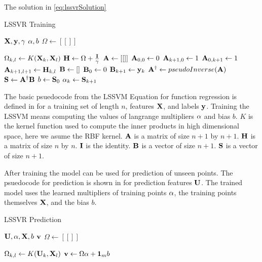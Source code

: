 The solution in \cref{eq:lssvrSolution}

\begin{algorithm}[H]
  \caption{LSSVR Training}\label{alg1:cap}
  \begin{algorithmic}[1]
    \Require $\vb{X}, \vb{y}, \gamma$
    \Ensure $\vb{\alpha}, b$
    \State $\Omega \gets [[]]$ 

    \State$\Omega_{k,l}\gets K(\vb{X}_k,\vb{X}_l)$
    \EndFor
    \EndFor
    \State $\vb{H} \gets \Omega + \frac{\vb{I}}{\gamma}$
    \State $\vb{A} \gets [[]]$ 
    \State $\vb{A}_{0,0} \gets 0$
    \State $\vb{A}_{k+1,0} \gets 1$
    \State $\vb{A}_{0,k+1} \gets 1$
    \EndFor
    \State $\vb{A}_{k+1,l+1} \gets \vb{H}_{k,l}$
    \EndFor
    \EndFor
    \State $\vb{B}\gets []$ 
    \State $\vb{B}_0 \gets 0$
    \State $\vb{B}_{k+1} \gets \vb{y}_{k}$
    \EndFor
    \State $\vb{A}^{\dagger} \gets pseudoInverse(\vb{A})$ 
    \State $\vb{S} \gets \vb{A}^{\dagger}\vb{B}$
    \State $b \gets \vb{S}_{0}$
    \State $\vb{\alpha}_{k} \gets \vb{S}_{k+1}$
    \EndFor
  \end{algorithmic}
\end{algorithm}

The basic psuedocode from the LSSVM Equation for function regression is defined in  for a training set of length $n$, features $\vb{X}$, and labels $\vb{y}$. Training the LSSVM means computing the values of langrange multipliers $\vb{\alpha}$ and bias $b$. $K$ is the kernel function used to compute the inner products in high dimensional space, here we asume the RBF kernel. $\vb{A}$ is a matrix of size $n+1$ by $n+1$. $\vb{H}$ is a matrix of size $n$ by $n$. $\vb{I}$ is the identity. $\vb{B}$ is a vector of size $n+1$. $\vb{S}$ is a vector of size $n+1$.

After training the model can be used for prediction of unseen points. The psuedocode for prediction is shown in  for prediction features $\vb{U}$. The trained model uses the learned multipliers of training points $\vb{\alpha}$, the training points themselves $\vb{X}$, and the bias $b$.

\begin{algorithm}[H]
  \caption{LSSVR Prediction}\label{alg2:cap}
  \begin{algorithmic}[1]
    \Require $\vb{U}, \vb{\alpha}, \vb{X}, b$
    \Ensure $\vb{v}$
    \State $\Omega \gets [[]]$ 

    \State$\Omega_{k,l}\gets K(\vb{U}_{k},\vb{X}_l)$
    \EndFor
    \EndFor
    \State $\vb{v} \gets \Omega\vb{\alpha} + \vb{1}_{m}b$
  \end{algorithmic}
\end{algorithm}

